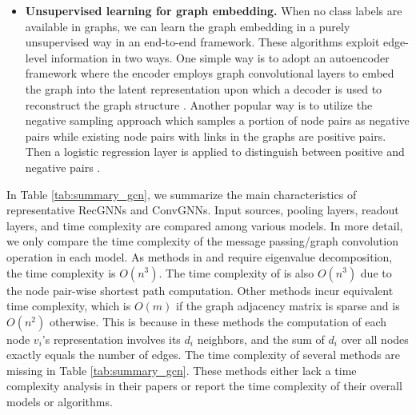 \begin{itemize}
        \item \textbf{Unsupervised learning for graph embedding.} When no class labels are available in graphs, we can learn the graph embedding in a purely unsupervised way in an end-to-end framework. These algorithms exploit edge-level information in two ways. One simple way is to adopt an autoencoder framework where the encoder employs graph convolutional layers to embed the graph into the latent representation upon which a decoder is used to reconstruct the graph structure \cite{kipf2016variational,pan2018adversarially}.  Another popular way is to utilize the negative sampling approach which samples a portion of node pairs as negative pairs while existing node pairs with links in the graphs are positive pairs. Then a logistic regression layer is applied to distinguish between positive and negative pairs \cite{hamilton2017inductive}. 
    \end{itemize}
    
    In Table \ref{tab:summary_gcn}, we summarize the main characteristics of representative RecGNNs and ConvGNNs. Input sources, pooling layers, readout layers, and time complexity are compared among various models. In more detail, we only compare the time complexity of the message passing/graph convolution operation in each model. As methods in \cite{bruna2013spectral} and \cite{henaff2015deep} require eigenvalue decomposition, the time complexity is $O(n^3)$. The time complexity of \cite{tran2018filter} is also $O(n^3)$ due to the node pair-wise shortest path computation.  Other methods incur equivalent time complexity, which is $O(m)$ if the graph adjacency matrix is sparse and is $O(n^2)$ otherwise. This is because in these methods the computation of each node $v_i$'s representation involves its $d_i$ neighbors, and the sum of $d_i$ over all nodes exactly equals the number of edges. The time complexity of several methods are missing in Table \ref{tab:summary_gcn}. These methods either lack a time complexity analysis in their papers or report the time complexity of their overall models or algorithms. %

    

